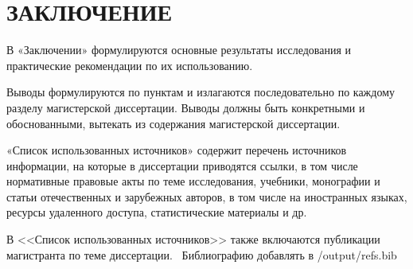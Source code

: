 \chapter*{ \large ЗАКЛЮЧЕНИЕ}


В «Заключении» формулируются основные результаты исследования и практические рекомендации по их использованию.

Выводы формулируются по пунктам и излагаются последовательно по каждому разделу магистерской диссертации. Выводы должны быть конкретными и обоснованными, вытекать из содержания магистерской диссертации.

«Список использованных источников» содержит перечень источников информации, на которые в диссертации приводятся ссылки, в том числе нормативные правовые акты по теме исследования, учебники, монографии и статьи отечественных и зарубежных авторов, в том числе на иностранных языках, ресурсы удаленного доступа, статистические материалы и др.

В <<Список использованных источников>> также включаются публикации магистранта по теме диссертации.~\cite{bib-prikaz} \cite{bibtex} Библиографию добавлять в /output/refs.bib